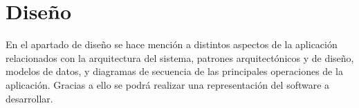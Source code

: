 \chapter{Diseño}

En el apartado de diseño se hace mención a distintos aspectos de la aplicación relacionados con la arquitectura del sistema, patrones arquitectónicos y de diseño, modelos de datos, y diagramas de secuencia de las principales operaciones de la aplicación. Gracias a ello se podrá realizar una representación del software a desarrollar.






